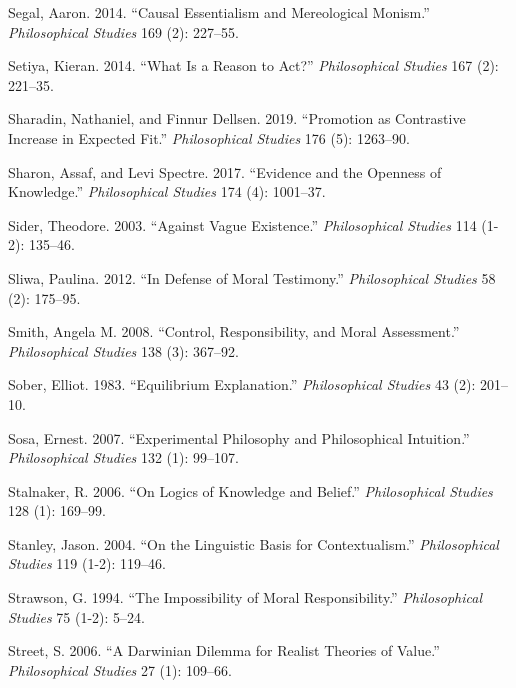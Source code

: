 \documentclass[
  10pt,
  letterpaper,
  DIV=11,
  numbers=noendperiod,
  twoside]{scrartcl}
\newlength{\cslhangindent}
\newenvironment{CSLReferences}[2] %
 {\begin{list}{}{%
  \setlength{\itemindent}{0pt}
  \setlength{\leftmargin}{0pt}
  \setlength{\parsep}{0pt}
  \ifodd #1
   \setlength{\leftmargin}{\cslhangindent}
   \setlength{\itemindent}{-1\cslhangindent}
  \fi
  \setlength{\itemsep}{#2\baselineskip}}}
 {\end{list}}
\begin{document}
\begin{CSLReferences}{1}{0}
Segal, Aaron. 2014. {``Causal Essentialism and Mereological Monism.''}
\emph{Philosophical Studies} 169 (2): 227--55.

Setiya, Kieran. 2014. {``What Is a Reason to Act?''} \emph{Philosophical
Studies} 167 (2): 221--35.

Sharadin, Nathaniel, and Finnur Dellsen. 2019. {``Promotion as
Contrastive Increase in Expected Fit.''} \emph{Philosophical Studies}
176 (5): 1263--90.

Sharon, Assaf, and Levi Spectre. 2017. {``Evidence and the Openness of
Knowledge.''} \emph{Philosophical Studies} 174 (4): 1001--37.

Sider, Theodore. 2003. {``Against Vague Existence.''}
\emph{Philosophical Studies} 114 (1-2): 135--46.

Sliwa, Paulina. 2012. {``In Defense of Moral Testimony.''}
\emph{Philosophical Studies} 58 (2): 175--95.

Smith, Angela M. 2008. {``Control, Responsibility, and Moral
Assessment.''} \emph{Philosophical Studies} 138 (3): 367--92.

Sober, Elliot. 1983. {``Equilibrium Explanation.''} \emph{Philosophical
Studies} 43 (2): 201--10.

Sosa, Ernest. 2007. {``Experimental Philosophy and Philosophical
Intuition.''} \emph{Philosophical Studies} 132 (1): 99--107.

Stalnaker, R. 2006. {``On Logics of Knowledge and Belief.''}
\emph{Philosophical Studies} 128 (1): 169--99.

Stanley, Jason. 2004. {``On the Linguistic Basis for Contextualism.''}
\emph{Philosophical Studies} 119 (1-2): 119--46.

Strawson, G. 1994. {``The Impossibility of Moral Responsibility.''}
\emph{Philosophical Studies} 75 (1-2): 5--24.

Street, S. 2006. {``A Darwinian Dilemma for Realist Theories of
Value.''} \emph{Philosophical Studies} 27 (1): 109--66.


\end{CSLReferences}
\end{document}
